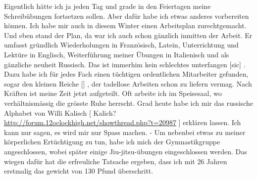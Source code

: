 \def\day{7. Januar 1943}
\mktitle

Eigentlich h\"{a}tte ich ja jeden Tag und grade in den Feiertagen meine Schreib\"{u}bungen fortsetzen sollen.
Aber daf\"{u}r habe ich etwas anderes vorbereiten k\"{o}nnen.
Ich habe mir auch in diesem Winter einen Arbeitsplan zurechtgemacht.
Und eben stand der Plan, da war ich auch schon g\"{a}nzlich inmitten der Arbeit.
Er umfasst gr\"{u}ndlich Wiederholungen in Franz\"{o}sisch, Latein, Unterrichtung und Lekt\"{u}re in Englisch, Weiterf\"{u}hrung meiner \"{U}bungen in Italienisch und als g\"{a}nzliche neuheit Russisch.
Das ist immerhim kein schlechtes unterfangen{\color{red} [sic] }.
Dazu habe ich f\"{u}r jedes Fach einen t\"{u}chtigen ordentlichen Mitarbeiter gefunden, sogar den kleinen Reiche {\color{red} [] }, der tadellose Arbeiten schon zu liefern vermag.
Nach Kr\"{a}ften ist meine Zeit jetzt aufgeteilt.
Oft arbeite ich im Speisesaal, wo verh\"{a}ltnism\"{a}ssig die gr\"{o}sste Ruhe herrscht.
Grad heute habe ich mir das russische Alphabet von Willi Kalisch{\color{red} [ Kalich? \url{http://forum.12oclockhigh.net/showthread.php?t=20987} ] } erkl\"{a}ren lassen.
Ich kann nur sagen, es wird mir nur Spass machen.
- Um nebenbei etwas zu meiner k\"{o}rperlichen Ert\"{u}chtigung zu tun, habe ich mich der Gymnastikgruppe angeschlossen, wobei sp\"{a}ter einige Jiu-jitsu-\"{u}bungen eingeschlossen werden.
Das wiegen daf\"{u}r hat die erfreuliche Tatsache ergeben, dass ich mit 26 Jahren erstmalig das gewicht von 130 Pfund \"{u}berschritt.

\clearpage
